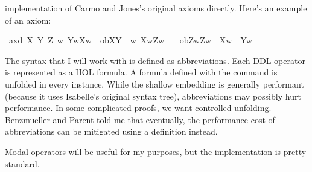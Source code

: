 \begin{isabellebody}
\begin{isamarkuptext}
implementation of Carmo and Jones's original axioms directly. Here's an example of an axiom:%
\end{isamarkuptext}\isamarkuptrue%
\isanewline
{}\ ax{\isacharunderscore}{}d{\isacharcolon}\ {\isachardoublequoteopen}{\isasymforall}X\ Y\ Z{\isachardot}\ {\isacharparenleft}{\isacharparenleft}{\isasymforall}w{\isachardot}\ Y{\isacharparenleft}w{\isacharparenright}{\isasymlongrightarrow}X{\isacharparenleft}w{\isacharparenright}{\isacharparenright}\ {\isasymand}\ ob{\isacharparenleft}X{\isacharparenright}{\isacharparenleft}Y{\isacharparenright}\ {\isasymand}\ {\isacharparenleft}{\isasymforall}w{\isachardot}\ X{\isacharparenleft}w{\isacharparenright}{\isasymlongrightarrow}Z{\isacharparenleft}w{\isacharparenright}{\isacharparenright}{\isacharparenright}\ \isanewline
\ \ {\isasymlongrightarrow}ob{\isacharparenleft}Z{\isacharparenright}{\isacharparenleft}{\isasymlambda}w{\isachardot}{\isacharparenleft}Z{\isacharparenleft}w{\isacharparenright}\ {\isasymand}\ {\isasymnot}X{\isacharparenleft}w{\isacharparenright}{\isacharparenright}\ {\isasymor}\ Y{\isacharparenleft}w{\isacharparenright}{\isacharparenright}{\isachardoublequoteclose}\isanewline
%
\isanewline
%
\isadelimdocument
%
\endisadelimdocument
%
\isatagdocument
%
\isamarkuptrue%
%
\endisatagdocument
{\isafolddocument}%
%
\isadelimdocument
%
\endisadelimdocument
%
\begin{isamarkuptext}%
The syntax that I will work with is defined as abbreviations. Each DDL operator is represented 
as a HOL formula. A formula defined with the  command is unfolded in every 
instance. While the shallow embedding is generally performant (because it uses Isabelle's original 
syntax tree), abbreviations may possibly hurt performance. In some complicated proofs, we want controlled
unfolding. Benzmueller and Parent told me that eventually, the performance cost of abbreviations can 
be mitigated using a definition instead.%
\end{isamarkuptext}\isamarkuptrue%
%
\begin{isamarkuptext}%
Modal operators will be useful for my purposes, but the implementation is pretty standard.%

\end{isamarkuptext}
\end{isabellebody}

